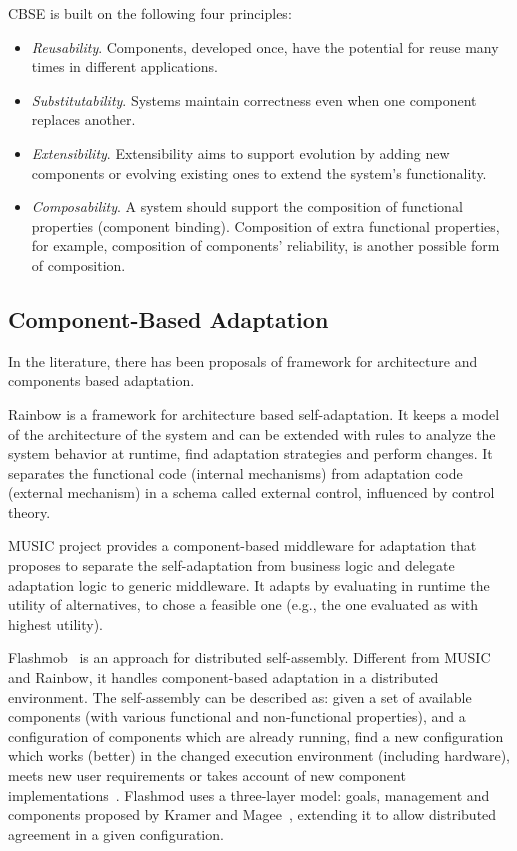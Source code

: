 CBSE is built on the following four principles\cite{crnkovic_software_2011}:
\begin{itemize}
  \item \emph{Reusability}. Components, developed once, have the potential for reuse many times in different applications.
  \item \emph{Substitutability}. Systems maintain correctness even when one component replaces another.
  \item \emph{Extensibility}. Extensibility aims to support evolution by adding new components or evolving existing ones to extend the system’s functionality.
  \item \emph{Composability}. A system should support the composition of functional properties (component binding). Composition of extra functional properties, for example, composition of components’ reliability, is another possible form of composition.
\end{itemize}

\subsection{Component-Based Adaptation}

In the literature, there has been proposals of framework for architecture and components based adaptation.

Rainbow\cite{garlan_rainbow:_2004} is a framework for architecture based self-adaptation. It keeps a model of the architecture of the system and can be extended with rules to analyze the system behavior at runtime, find adaptation strategies and perform changes. It separates the functional code (internal mechanisms) from adaptation code (external mechanism) in a schema called external control, influenced by control theory.

MUSIC\cite{rouvoy_music:_2009} project provides a component-based middleware for adaptation that proposes to separate the self-adaptation from business logic and delegate adaptation logic to generic middleware. It adapts by evaluating in runtime the utility of alternatives, to chose a feasible one (e.g., the one evaluated as with highest utility).

Flashmob~\cite{sykes_flashmob:_2011} is an approach for distributed self-assembly. Different from MUSIC and Rainbow, it handles component-based adaptation in a distributed environment. The self-assembly can be described as: given a set of available components (with various functional and non-functional properties), and a configuration of components which are already running, find a new configuration which works (better) in the changed execution environment (including hardware),
meets new user requirements or takes account of new component implementations~\cite{sykes_flashmob:_2011}. Flashmod uses a three-layer model: goals, management and components proposed by Kramer and Magee~\cite{kramer_self-managed_2007}, extending it to allow distributed agreement in a given configuration.


